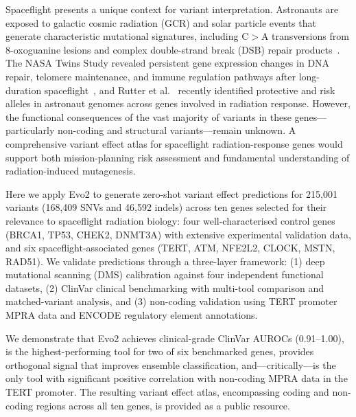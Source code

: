 Spaceflight presents a unique context for variant interpretation. Astronauts are
exposed to galactic cosmic radiation (GCR) and solar particle events that
generate characteristic mutational signatures, including C$>$A transversions
from 8-oxoguanine lesions and complex double-strand break (DSB)
repair products~\cite{daSilveira_2020}. The NASA Twins Study revealed persistent
gene expression changes in DNA repair, telomere maintenance, and immune
regulation pathways after long-duration spaceflight~\cite{Twins_2019}, and
Rutter et al.~\cite{Rutter_2024} recently identified protective and risk alleles
in astronaut genomes across genes involved in radiation response. However, the
functional consequences of the vast majority of variants in these genes---particularly
non-coding and structural variants---remain unknown. A comprehensive variant
effect atlas for spaceflight radiation-response genes would support both
mission-planning risk assessment and fundamental understanding of
radiation-induced mutagenesis.

Here we apply Evo2 to generate zero-shot variant effect predictions for 215,001
variants (168,409 SNVs and 46,592 indels) across ten genes selected for their
relevance to spaceflight radiation biology: four well-characterised control genes
(BRCA1, TP53, CHEK2, DNMT3A) with extensive experimental validation data, and
six spaceflight-associated genes (TERT, ATM, NFE2L2, CLOCK, MSTN, RAD51). We
validate predictions through a three-layer framework: (1) deep mutational
scanning (DMS) calibration against four independent functional datasets, (2)
ClinVar clinical benchmarking with multi-tool comparison and matched-variant
analysis, and (3) non-coding validation using TERT promoter MPRA data and ENCODE
regulatory element annotations.

We demonstrate that Evo2 achieves clinical-grade ClinVar AUROCs (0.91--1.00),
is the highest-performing tool for two of six benchmarked genes, provides
orthogonal signal that improves ensemble classification, and---critically---is
the only tool with significant positive correlation with non-coding MPRA data
in the TERT promoter. The resulting variant effect atlas, encompassing coding
and non-coding regions across all ten genes, is provided as a public resource.
